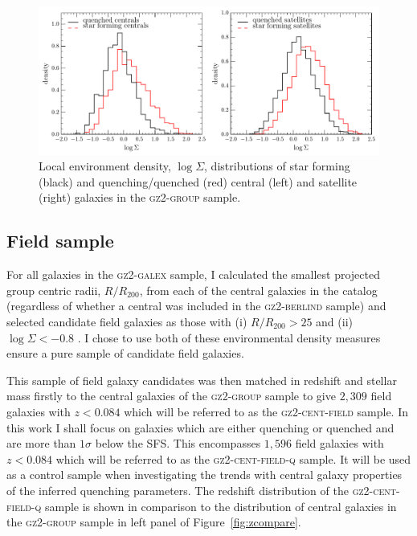 \begin{figure}
\centering
\includegraphics[width=\textwidth]{environment/SIGMA_density_sf_q_cent_sat.pdf}
\caption[Local environment density distributions of central and satellite galaxies]{Local environment density, $\log\Sigma$, distributions of star forming (black) and quenching/quenched (red) central (left) and satellite (right) galaxies in the \textsc{gz2-group} sample.}
\label{fig:sigmadist}
\end{figure}


\subsection{Field sample}\label{sec:field}

For all galaxies in the \textsc{gz2-galex} sample, I calculated the smallest projected group centric radii, $R/R_{200}$, from each of the central galaxies in the \citet{berlind06} catalog (regardless of whether a central was included in the \textsc{gz2-berlind} sample) and selected candidate field galaxies as those with (i) $R/R_{200} > 25$ and (ii) $\log\Sigma < -0.8$ \citep[the threshold on the local environment density which selects field galaxies as defined by][]{Baldry06}. I chose to use both of these environmental density measures ensure a pure sample of candidate field galaxies.

This sample of field galaxy candidates was then matched in redshift and stellar mass firstly to the central galaxies of the \textsc{gz2-group} sample to give $2,309$ field galaxies with $z < 0.084$ which will be referred to as the \textsc{gz2-cent-field} sample. In this work I shall focus on galaxies which are either quenching or quenched and are more than $1\sigma$ below the SFS. This encompasses $1,596$ field galaxies with $z < 0.084$ which will be referred to as the \textsc{gz2-cent-field-q} sample. It will be used as a control sample when investigating the trends with central galaxy properties of the inferred quenching parameters. The redshift distribution of the \textsc{gz2-cent-field-q} sample is shown in comparison to the distribution of central galaxies in the \textsc{gz2-group} sample in left panel of Figure~\ref{fig:zcompare}. %

